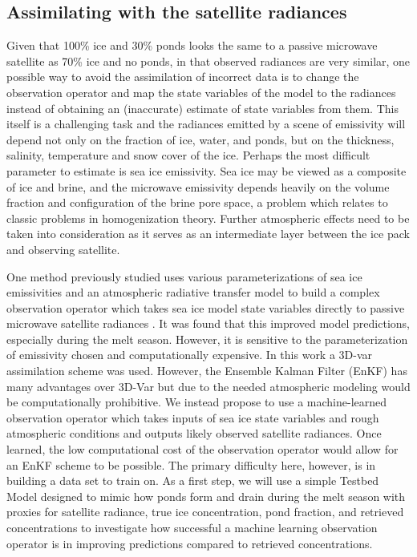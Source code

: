 \subsection{Assimilating with the satellite radiances}\label{sec:motivation}
\par Given that 100\% ice and 30\% ponds looks the same to a passive microwave satellite as 70\% ice and no ponds, in that observed radiances are very similar, one possible way to avoid the assimilation of incorrect data is to change the observation operator and map the state variables of the model to the radiances instead of obtaining an (inaccurate) estimate of state variables from them. This itself is a challenging task and the radiances emitted by a scene of emissivity will depend not only on the fraction of ice, water, and ponds, but on the thickness, salinity, temperature and snow cover of the ice. Perhaps the most difficult parameter to estimate is sea ice emissivity. Sea ice may be viewed as a composite of ice and brine, and the microwave emissivity depends heavily on the volume fraction and configuration of the brine pore space, a problem which relates to classic problems in homogenization theory. Further atmospheric effects need to be taken into consideration as it serves as an intermediate layer between the ice pack and observing satellite. 

\par One method previously studied uses various parameterizations of sea ice emissivities and an atmospheric radiative transfer model to build a complex observation operator which takes sea ice model state variables directly to passive microwave satellite radiances \cite{scott2012}. It was found that this improved model predictions, especially during the melt season. However, it is sensitive to the parameterization of emissivity chosen and computationally expensive. In this work a 3D-var assimilation scheme was used. However, the Ensemble Kalman Filter (EnKF) has many advantages over 3D-Var but due to the needed atmospheric modeling would be computationally prohibitive. We instead propose to use a machine-learned observation operator which takes inputs of sea ice state variables and rough atmospheric conditions and outputs likely observed satellite radiances. Once learned, the low computational cost of the observation operator would allow for an EnKF scheme to be possible. The primary difficulty here, however, is in building a data set to train on. As a first step, we will use a simple Testbed Model designed to mimic how ponds form and drain during the melt season with proxies for satellite radiance, true ice concentration, pond fraction, and retrieved concentrations to investigate how successful a machine learning observation operator is in improving predictions compared to retrieved concentrations.  

